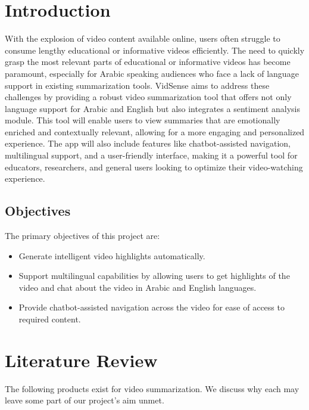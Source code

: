 \documentclass{bscs}
\begin{document}
\chapter{Introduction}
With the explosion of video content available online, users often struggle to consume lengthy educational or informative videos efficiently. The need to quickly grasp the most relevant parts of educational or informative videos has become paramount, especially for Arabic speaking audiences who face a lack of language support in existing summarization tools.
VidSense aims to address these challenges by providing a robust video summarization tool that offers not only language support for Arabic and English but also integrates a sentiment analysis module. This tool will enable users to view summaries that are emotionally enriched and contextually relevant, allowing for a more engaging and personalized experience.
The app will also include features like chatbot-assisted navigation, multilingual support, and a user-friendly interface, making it a powerful tool for educators, researchers, and general users looking to optimize their video-watching experience.



\section{Objectives}
The primary objectives of this project are:
\begin{itemize}
    \item Generate intelligent video highlights automatically.
    \item Support multilingual capabilities by allowing users to get highlights of the video and chat about the video in Arabic and English languages.
    \item Provide chatbot-assisted navigation across the video for ease of access to required content.
\end{itemize}

\chapter{Literature Review}
The following products exist for video summarization. We discuss why each may leave
some part of our project’s aim unmet.
\end{document}
